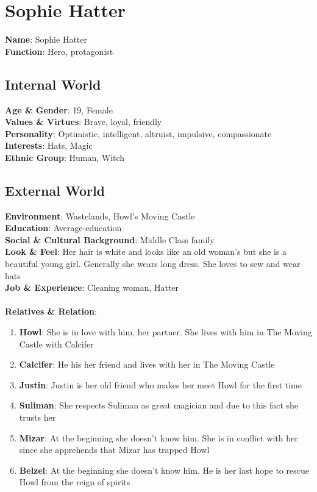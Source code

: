 \section{Sophie Hatter}

\textbf{Name}: Sophie Hatter \\
\textbf{Function}: Hero, protagonist

\subsection{Internal World}

\textbf{Age \& Gender}: 19, Female \\
\textbf{Values \& Virtues}: Brave, loyal, friendly \\
\textbf{Personality}: Optimistic, intelligent, altruist, impulsive, compassionate \\
\textbf{Interests}: Hats, Magic \\
\textbf{Ethnic Group}: Human, Witch

\subsection{External World}
\textbf{Environment}: Wastelands, Howl’s Moving Castle \\
\textbf{Education}: Average-education \\
\textbf{Social \& Cultural Background}: Middle Class family \\
\textbf{Look \& Feel}: Her hair is white and looks like an old woman’s but she is a beautiful young girl. Generally she wears long dress. She loves to sew and wear hats \\
\textbf{Job \& Experience}: Cleaning woman, Hatter \\
\\
\textbf{Relatives \& Relation}:
\begin{enumerate}
\item \textbf{Howl}: She is in love with him, her partner. She lives with him in The Moving Castle with Calcifer
\item \textbf{Calcifer}: He his her friend and lives with her in The Moving Castle
\item \textbf{Justin}: Justin is her old friend who makes her meet Howl for the first time
\item \textbf{Suliman}: She respects Suliman as great magician and due to this fact she trusts her
\item \textbf{Mizar}: At the beginning she doesn’t know him. She is in conflict with her since she 
apprehends that Mizar has trapped Howl
\item \textbf{Belzel}: At the beginning she doesn’t know him. He is her last hope to rescue Howl from the reign of spirits
\end{enumerate}


